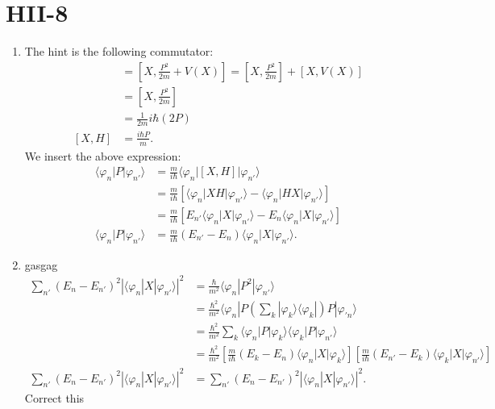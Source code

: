\documentclass[letterpaper,11pt,twoside]{article}
\newcommand{\ket}[1]{|#1\rangle}
\newcommand{\bra}[1]{\langle#1|}
\newcommand{\braket}[1]{\langle#1\rangle}
\begin{document}
\section*{HII-8}
\begin{enumerate}[itemsep=0pt,topsep=0pt,label=\alph*.]
  \item The hint is the following commutator:
  \begin{align*}
    [X,H]&=[X,\frac{P^2}{2m}+V(X)]=[X,\frac{P^2}{2m}]+[X,V(X)]\\
    &=[X,\frac{P^2}{2m}]\\
    &=\frac{1}{2m}i\hbar(2P)\\
    [X,H]&=\frac{i\hbar P}{m}.
  \end{align*}
  We insert the above expression:
  \begin{align*}
    \braket{\varphi_n|P|\varphi_{n'}}&=\frac{m}{i\hbar}\braket{\varphi_n|[X,H]|\varphi_{n'}}\\
    &=\frac{m}{i\hbar}[\braket{\varphi_n|XH|\varphi_{n'}}-\braket{\varphi_n|HX|\varphi_{n'}}]\\
    &=\frac{m}{i\hbar}[E_{n'}\braket{\varphi_n|X|\varphi_{n'}}-E_n\braket{\varphi_n|X|\varphi_{n'}}]\\
    \braket{\varphi_n|P|\varphi_{n'}}&=\frac{m}{i\hbar}(E_{n'}-E_n)\braket{\varphi_n|X|\varphi_{n'}}.
  \end{align*}
  \item gasgag
  \begin{align*}
    \sum_{n'}(E_n-E_{n'})^2|\braket{\varphi_n|X|\varphi_{n'}}|^2&=\frac{\hbar}{m^2}\braket{\varphi_n|P^2|\varphi_{n'}}\\
    &=\frac{\hbar^2}{m^2}\braket{\varphi_n|P\left(\sum_k\ket{\varphi_k}\bra{\varphi_k}\right)P|\varphi_{'n}}\\
    &=\frac{\hbar^2}{m^2}\sum_k\braket{\varphi_n|P|\varphi_k}\braket{\varphi_k|P|\varphi_{n'}}\\
    &=\frac{\hbar^2}{m^2}\left[\frac{m}{i\hbar}(E_{k}-E_n)\braket{\varphi_n|X|\varphi_{k}}\right]\left[\frac{m}{i\hbar}(E_{n'}-E_k)\braket{\varphi_k|X|\varphi_{n'}}\right]\\
    \sum_{n'}(E_n-E_{n'})^2|\braket{\varphi_n|X|\varphi_{n'}}|^2&=\sum_{n'}(E_n-E_{n'})^2|\braket{\varphi_n|X|\varphi_{n'}}|^2.
  \end{align*}
  Correct this
\end{enumerate}
\end{document}
